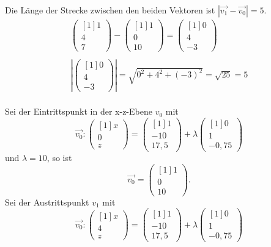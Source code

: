 Die Länge der Strecke zwischen den beiden Vektoren ist $\displaystyle \left| \overrightarrow{v_{1}} -\overrightarrow{v_{0}}\right| =5$.
\begin{gather*}
	\begin{pmatrix}[1]
		1\\
		4\\
		7
	\end{pmatrix} -\begin{pmatrix}[1]
		1\\
		0\\
		10
	\end{pmatrix} =\begin{pmatrix}[1]
		0\\
		4\\
		-3
	\end{pmatrix}\\
	\\
	\left| \begin{pmatrix}[1]
		0\\
		4\\
		-3
	\end{pmatrix}\right| =\sqrt{0^{2} +4^{2} +( -3)^{2}} =\sqrt{25} =5
\end{gather*}
\\
Sei der Eintrittspunkt in der x-z-Ebene $\displaystyle v_{0}$ mit
\begin{equation*}
	\overrightarrow{v_{0}} :\begin{pmatrix}[1]
		x\\
		0\\
		z
	\end{pmatrix} =\begin{pmatrix}[1]
		1\\
		-10\\
		17,5
	\end{pmatrix} +\lambda \begin{pmatrix}[1]
		0\\
		1\\
		-0,75
	\end{pmatrix}
\end{equation*}
und $\displaystyle \lambda =10$, so ist
\begin{equation*}
	\overrightarrow{v_{0}} =\begin{pmatrix}[1]
		1\\
		0\\
		10
	\end{pmatrix}\text{.}
\end{equation*}
Sei der Austrittspunkt $\displaystyle v_{1}$ mit
\begin{equation*}
	\overrightarrow{v_{0}} :\begin{pmatrix}[1]
		x\\
		4\\
		z
	\end{pmatrix} =\begin{pmatrix}[1]
		1\\
		-10\\
		17,5
	\end{pmatrix} +\lambda \begin{pmatrix}[1]
		0\\
		1\\
		-0,75
	\end{pmatrix}
\end{equation*}
